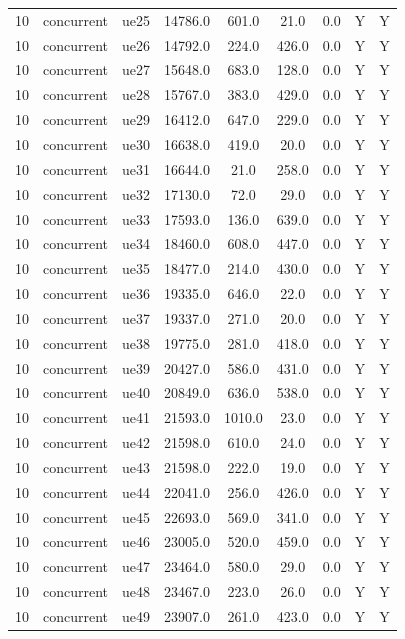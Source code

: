 \begin{table}[ht]
\begin{tabular}{|c|c|c|c|c|c|c|c|c|}
10 & concurrent & ue25 & 14786.0 & 601.0 & 21.0 & 0.0 & Y & Y \\
10 & concurrent & ue26 & 14792.0 & 224.0 & 426.0 & 0.0 & Y & Y \\
10 & concurrent & ue27 & 15648.0 & 683.0 & 128.0 & 0.0 & Y & Y \\
10 & concurrent & ue28 & 15767.0 & 383.0 & 429.0 & 0.0 & Y & Y \\
10 & concurrent & ue29 & 16412.0 & 647.0 & 229.0 & 0.0 & Y & Y \\
10 & concurrent & ue30 & 16638.0 & 419.0 & 20.0 & 0.0 & Y & Y \\
10 & concurrent & ue31 & 16644.0 & 21.0 & 258.0 & 0.0 & Y & Y \\
10 & concurrent & ue32 & 17130.0 & 72.0 & 29.0 & 0.0 & Y & Y \\
10 & concurrent & ue33 & 17593.0 & 136.0 & 639.0 & 0.0 & Y & Y \\
10 & concurrent & ue34 & 18460.0 & 608.0 & 447.0 & 0.0 & Y & Y \\
10 & concurrent & ue35 & 18477.0 & 214.0 & 430.0 & 0.0 & Y & Y \\
10 & concurrent & ue36 & 19335.0 & 646.0 & 22.0 & 0.0 & Y & Y \\
10 & concurrent & ue37 & 19337.0 & 271.0 & 20.0 & 0.0 & Y & Y \\
10 & concurrent & ue38 & 19775.0 & 281.0 & 418.0 & 0.0 & Y & Y \\
10 & concurrent & ue39 & 20427.0 & 586.0 & 431.0 & 0.0 & Y & Y \\
10 & concurrent & ue40 & 20849.0 & 636.0 & 538.0 & 0.0 & Y & Y \\
10 & concurrent & ue41 & 21593.0 & 1010.0 & 23.0 & 0.0 & Y & Y \\
10 & concurrent & ue42 & 21598.0 & 610.0 & 24.0 & 0.0 & Y & Y \\
10 & concurrent & ue43 & 21598.0 & 222.0 & 19.0 & 0.0 & Y & Y \\
10 & concurrent & ue44 & 22041.0 & 256.0 & 426.0 & 0.0 & Y & Y \\
10 & concurrent & ue45 & 22693.0 & 569.0 & 341.0 & 0.0 & Y & Y \\
10 & concurrent & ue46 & 23005.0 & 520.0 & 459.0 & 0.0 & Y & Y \\
10 & concurrent & ue47 & 23464.0 & 580.0 & 29.0 & 0.0 & Y & Y \\
10 & concurrent & ue48 & 23467.0 & 223.0 & 26.0 & 0.0 & Y & Y \\
10 & concurrent & ue49 & 23907.0 & 261.0 & 423.0 & 0.0 & Y & Y \\

\end{tabular}
\end{table}
